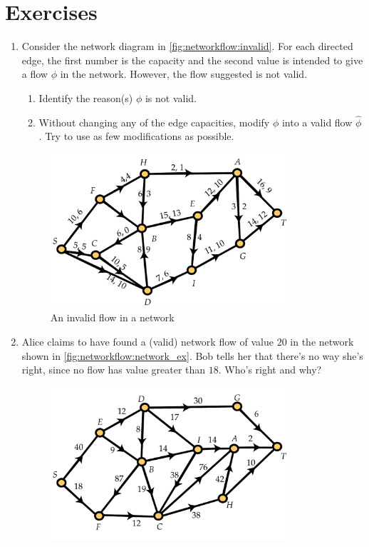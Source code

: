 \section{Exercises}

\begin{enumerate}
\item Consider the network diagram in
  \autoref{fig:networkflow:invalid}. For each directed edge, the first
  number is the capacity and the second value is intended to give a
  flow $\phi$ in the network. However, the flow suggested is not
  valid.
  \begin{enumerate}
  \item Identify the reason(s) $\phi$ is not valid.
  \item Without changing any of the edge capacities, modify $\phi$
    into a valid flow $\widehat{\phi}$. Try to use as few modifications as
    possible.
  \end{enumerate}
  \begin{figure}
    \centering
    \includegraphics[width=3.5in]{networkflow-figs/networkflow_ex_invalid}
    \caption{An invalid flow in a network}
    \label{fig:networkflow:invalid}
  \end{figure}
\item Alice claims to have found a (valid) network flow of value $20$
  in the network shown in \autoref{fig:networkflow:network_ex}. Bob
  tells her that there's no way she's right, since no flow has value
  greater than $18$. Who's right and why?
  \begin{figure}
    \centering
    \includegraphics[width=3.5in]{networkflow-figs/network_ex}

\end{figure}
\end{enumerate}
